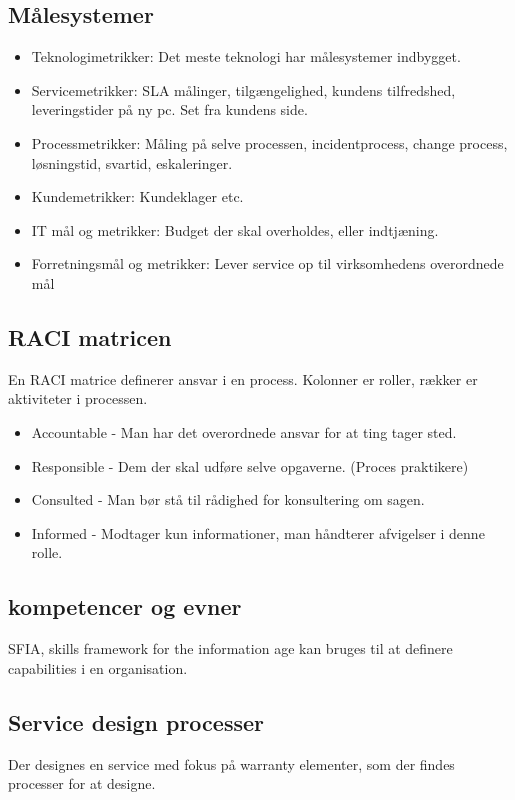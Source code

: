 \subsection{Målesystemer}
\begin{itemize}
\item Teknologimetrikker: Det meste teknologi har målesystemer indbygget.
\item Servicemetrikker: SLA målinger, tilgængelighed, kundens tilfredshed, leveringstider på ny pc. Set fra kundens side. 
\item Processmetrikker: Måling på selve processen, incidentprocess, change process, løsningstid, svartid, eskaleringer.
\item Kundemetrikker: Kundeklager etc.
\item IT mål og metrikker: Budget der skal overholdes, eller indtjæning.
\item Forretningsmål og metrikker: Lever service op til virksomhedens overordnede mål
\end{itemize}


\subsection{RACI matricen}
En RACI matrice definerer ansvar i en process. Kolonner er roller, rækker er aktiviteter i processen.
\begin{itemize}
\item Accountable - Man har det overordnede ansvar for at ting tager sted.
\item Responsible -  Dem der skal udføre selve opgaverne. (Proces praktikere)
\item Consulted - Man bør stå til rådighed for konsultering om sagen.
\item Informed - Modtager kun informationer, man håndterer afvigelser i denne rolle.
\end{itemize}

\subsection{kompetencer og evner}
SFIA, skills framework for the information age kan bruges til at definere capabilities i en organisation.

\subsection{Service design processer}
Der designes en service med fokus på warranty elementer, som der findes processer for at designe.

